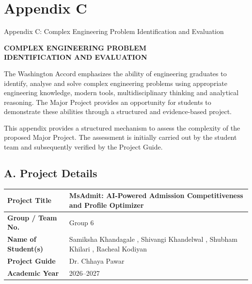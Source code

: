 
\chapter*{Appendix C}

{Appendix C: Complex Engineering Problem Identification and Evaluation}

\begin{center}
    {\Large\bfseries COMPLEX ENGINEERING PROBLEM}\\[0.15cm]
    {\Large\bfseries IDENTIFICATION AND EVALUATION}
\end{center}

\vspace{0.3cm}

\noindent
The Washington Accord emphasizes the ability of engineering graduates
to identify, analyse and solve complex engineering problems using
appropriate engineering knowledge, modern tools, multidisciplinary
thinking and analytical reasoning. The Major Project provides an
opportunity for students to demonstrate these abilities through a
structured and evidence-based project.

\vspace{0.25cm}

\noindent
This appendix provides a structured mechanism to assess the complexity
of the proposed Major Project. The assessment is initially carried out
by the student team and subsequently verified by the Project Guide.



\section*{A. Project Details}

\begin{center}
\renewcommand{\arraystretch}{1.4}

\begin{tabular}{|p{5cm}|p{9cm}|}
\hline
\textbf{Project Title} & MsAdmit: AI-Powered Admission Competitiveness and Profile Optimizer \\[0.5cm]
\hline
\textbf{Group / Team No.} & Group 6 \\[0.4cm]
\hline
\textbf{Name of Student(s)} & Samiksha Khandagale , Shivangi Khandelwal , Shubham Khilari , Racheal Kodiyan  \\[0.7cm]
\hline
\textbf{Project Guide} & Dr. Chhaya Pawar \\[0.4cm]
\hline
\textbf{Academic Year} & 2026--2027 \\[0.4cm]
\hline
\end{tabular}

\end{center}




